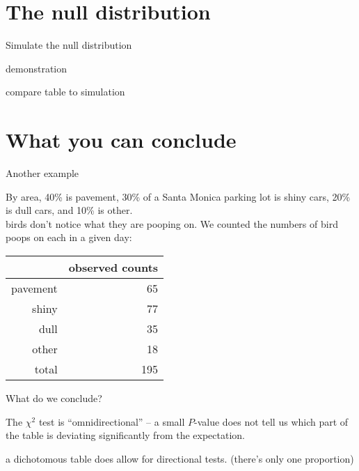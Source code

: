 \section{The null distribution}

\begin{frame}{Simulate the null distribution}


    \vspace{2em}

    demonstration

    \vspace{2em}

    compare table to simulation


\end{frame}


\section{What you can conclude}



\begin{frame}{Another example}

    By area, 
    40\% is pavement,
    30\% of a Santa Monica parking lot is shiny cars,
    20\% is dull cars,
    and 10\% is other.\\
     birds don't notice what they are pooping on.
    We counted the numbers of bird poops on each in a given day:
    \begin{center}
        \begin{tabular}{rr}
            & observed counts \\
            \hline 
            pavement & 65 \\
            shiny & 77 \\
            dull & 35 \\
            other & 18 \\
            \hline
            total & 195
        \end{tabular}
    \end{center}

\end{frame}


\begin{frame}{What do we conclude?}

    The $\chi^2$ test is ``omnidirectional'' --
    a small $P$-value does not tell us \alert{which part} of the table
    is deviating significantly from the expectation.

    \vspace{2em}

     a \alert{dichotomous} table does allow for directional tests.
    (there's only one proportion)


\end{frame}


